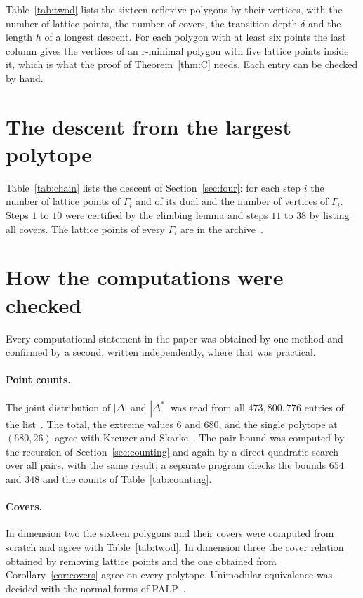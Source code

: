 \documentclass[manuscript]{aomart}
\theoremstyle{definition}
\theoremstyle{remark}
\begin{document}
Table~\ref{tab:twod} lists the sixteen reflexive polygons by their
vertices, with the number of lattice points, the number of covers, the
transition depth $\delta$ and the length $h$ of a longest descent. For each
polygon with at least six points the last column gives the vertices of an
r-minimal polygon with five lattice points inside it, which is what the
proof of Theorem~\ref{thm:C} needs. Each entry can be checked by hand.

\section{The descent from the largest polytope}\label{app:chain}

Table~\ref{tab:chain} lists the descent of Section~\ref{sec:four}: for each
step $i$ the number of lattice points of $\Gamma_i$ and of its dual and the
number of vertices of $\Gamma_i$. Steps $1$ to $10$ were certified by the
climbing lemma and steps $11$ to $38$ by listing all covers. The lattice
points of every $\Gamma_i$ are in the archive~\cite{Repo}.

\section{How the computations were checked}\label{app:checks}

Every computational statement in the paper was obtained by one method and
confirmed by a second, written independently, where that was practical.

\paragraph*{Point counts.} The joint distribution of $|\Delta|$ and
$|\Delta^*|$ was read from all $473{,}800{,}776$ entries of the
list~\cite{HF4D}. The total, the extreme values $6$ and $680$, and the
single polytope at $(680,26)$ agree with Kreuzer and Skarke~\cite{KS00}.
The pair bound was computed by the recursion of Section~\ref{sec:counting}
and again by a direct quadratic search over all pairs, with the same
result; a separate program checks the bounds $654$ and $348$ and the
counts of Table~\ref{tab:counting}.

\paragraph*{Covers.} In dimension two the sixteen polygons and their
covers were computed from scratch and agree with Table~\ref{tab:twod}. In
dimension three the cover relation obtained by removing lattice points and
the one obtained from Corollary~\ref{cor:covers} agree on every polytope.
Unimodular equivalence was decided with the normal forms of
PALP~\cite{KS04}.
\end{document}
